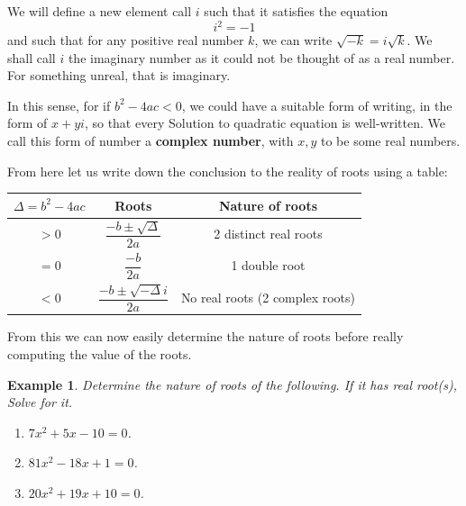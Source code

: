 \documentclass[12pt]{article}
\newtheorem{example}{Example}
\begin{document}
    We will define a new element call $i$ such that it satisfies the equation $$i^2=-1$$ and such that for any positive real number $k$, we can write $\sqrt{-k}=i\sqrt{k}$. We shall call $i$ the imaginary number as it could not be thought of as a real number. For something unreal, that is imaginary.

    In this sense, for if $b^2-4ac<0$, we could have a suitable form of writing, in the form of $x+yi$, so that every Solution to quadratic equation is well-written. We call this form of number a \textbf{complex number}, with $x,y$ to be some real numbers.

    From here let us write down the conclusion to the reality of roots using a table:

    \begin{center}
        \begin{tabular}{|c|c|c|}
            \hline
            $\Delta=b^2-4ac$&Roots&Nature of roots\\
            \hline
            $>0$&$\dfrac{-b\pm\sqrt{\Delta}}{2a}$&2 distinct real roots\\
            \hline
            $=0$&$\dfrac{-b}{2a}$&1 double root\\
            \hline
            $<0$&$\dfrac{-b\pm\sqrt{-\Delta}i}{2a}$&No real roots (2 complex roots)\\
            \hline
        \end{tabular}
    \end{center}

    From this we can now easily determine the nature of roots before really computing the value of the roots.

    \begin{example}
        Determine the nature of roots of the following. If it has real root(s), Solve for it.\begin{enumerate}
            \item[(a)] $7x^2+5x-10=0$.
            \item[(b)] $81x^2-18x+1=0$.
            \item[(c)] $20x^2+19x+10=0$.
        \end{enumerate}
    \end{example}
\end{document}
